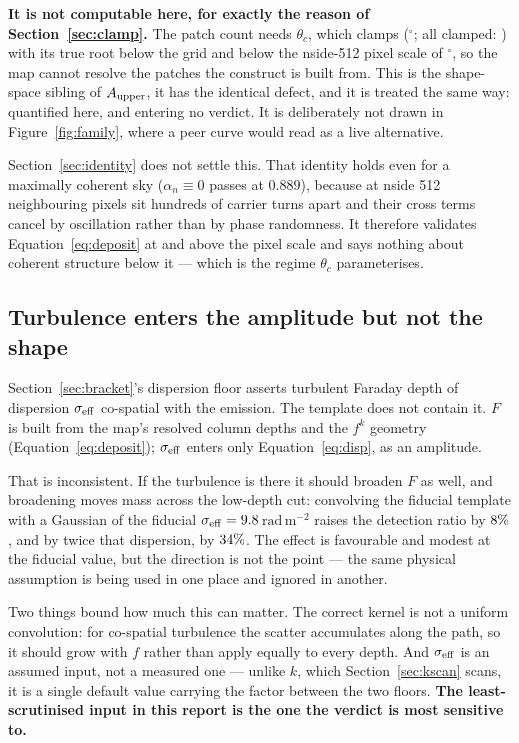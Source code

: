 \documentclass[11pt]{article}
\newcommand{\rmu}{\ensuremath{\mathrm{rad\,m^{-2}}}}
\begin{document}
\textbf{It is not computable here, for exactly the reason of
Section~\ref{sec:clamp}.} The patch count needs $\theta_c$, which
clamps (\tiltThetaCDeg$^\circ$; all clamped: \tiltThetaCClamped) with
its true root below the grid and below the nside-512 pixel scale of
\pixelScaleDeg$^\circ$, so the map cannot resolve the patches the
construct is built from. This is the shape-space sibling of
$A_{\rm upper}$, it has the identical defect, and it is treated the
same way: quantified here, and entering no verdict. It is deliberately
not drawn in Figure~\ref{fig:family}, where a peer curve would read as
a live alternative.

Section~\ref{sec:identity} does not settle this. That identity holds
even for a maximally coherent sky ($\alpha_n \equiv 0$ passes at
$0.889$), because at nside 512 neighbouring pixels sit hundreds of
carrier turns apart and their cross terms cancel by oscillation rather
than by phase randomness. It therefore validates
Equation~\eqref{eq:deposit} at and above the pixel scale and says
nothing about coherent structure below it --- which is the regime
$\theta_c$ parameterises.

\subsection{Turbulence enters the amplitude but not the shape}
\label{sec:sigmashape}

Section~\ref{sec:bracket}'s dispersion floor asserts turbulent Faraday
depth of dispersion $\sigma_{\rm eff}$ co-spatial with the emission.
The template does not contain it. $F$ is built from the map's resolved
column depths and the $f^k$ geometry
(Equation~\eqref{eq:deposit}); $\sigma_{\rm eff}$ enters only
Equation~\eqref{eq:disp}, as an amplitude.

That is inconsistent. If the turbulence is there it should broaden $F$
as well, and broadening moves mass across the low-depth cut: convolving
the fiducial template with a Gaussian of the fiducial
$\sigma_{\rm eff} = 9.8$\,\rmu{} raises the detection ratio by
$8\%$, and by twice that dispersion, by
$34\%$. The effect is favourable and modest at
the fiducial value, but the direction is not the point --- the same
physical assumption is being used in one place and ignored in another.

Two things bound how much this can matter. The correct kernel is not a
uniform convolution: for co-spatial turbulence the scatter accumulates
along the path, so it should grow with $f$ rather than apply equally to
every depth. And $\sigma_{\rm eff}$ is an assumed input, not a measured
one --- unlike $k$, which Section~\ref{sec:kscan} scans, it is a single
default value carrying the factor \floorRatioThirty{} between the two
floors. \textbf{The least-scrutinised input in this report is the one
the verdict is most sensitive to.}
\end{document}
